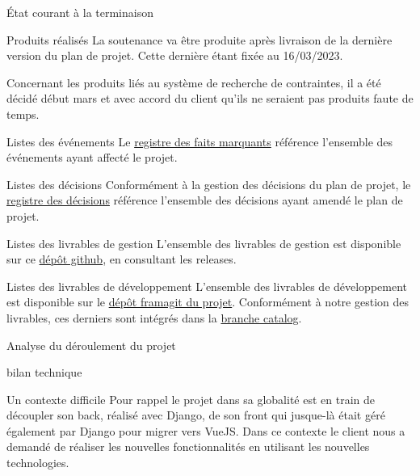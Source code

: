 \documentclass[]{article}
\begin{document}
{\begin{section}{État courant à la terminaison}
\begin{subsection}{Produits réalisés}
     La soutenance va être produite après livraison de la dernière version du plan de projet. Cette dernière étant fixée au 16/03/2023.

     Concernant les produits liés au système de recherche de contraintes, il a été décidé début mars et avec accord du client qu’ils ne seraient pas produits faute de temps.
 \end{subsection}

 \begin{subsection}{Listes des événements}
     Le \href{Registre_des_faits_marquants.pdf}{registre des faits marquants} référence l'ensemble des événements ayant affecté le projet.
 \end{subsection}

 \begin{subsection}{Listes des décisions}
     Conformément à la gestion des décisions du plan de projet, le \href{Registre_des_décisions.pdf}{registre des décisions} référence l'ensemble des décisions ayant amendé le plan de projet.
 \end{subsection}

 \begin{subsection}{Listes des livrables de gestion}
     L'ensemble des livrables de gestion est disponible sur ce \href{https://github.com/Szyckaa/UE-PROJET-DOCS-GESTION}{dépôt github}, en consultant les releases.
 \end{subsection}

 \begin{subsection}{Listes des livrables de développement}
     L'ensemble des livrables de développement est disponible sur le \href{https://framagit.org/flopedt/FlOpEDT}{dépôt framagit du projet}. Conformément à notre gestion des livrables, ces derniers sont intégrés dans la \href{https://framagit.org/flopedt/FlOpEDT/-/tree/catalog}{branche catalog}.
 \end{subsection}
\end{section}

\begin{section}{Analyse du déroulement du projet}
 \begin{subsection}{bilan technique}
     \begin{subsubsection}{Un contexte difficile}
         Pour rappel le projet dans sa globalité est en train de découpler son back, réalisé avec Django, de son front qui jusque-là était géré également par Django pour migrer vers VueJS. Dans ce contexte le client nous a demandé de réaliser les nouvelles fonctionnalités en utilisant les nouvelles technologies.


\end{subsubsection}
\end{subsection}
\end{section}}
\end{document}
